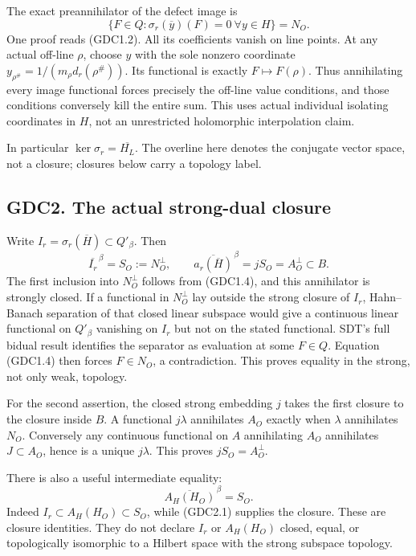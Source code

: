 The exact preannihilator of the defect image is \[
\boxed{\{F\in Q:\sigma_r(\overline y)(F)=0\ \forall y\in H\}=N_O.}
\tag{GDC1.4}
\] One proof reads (GDC1.2). All its coefficients vanish on line points.
At any actual off-line \(\rho\), choose \(y\) with the sole nonzero
coordinate \(y_{\rho^\#}=1/(m_\rho d_r(\rho^\#))\). Its functional is
exactly \(F\mapsto F(\rho)\). Thus annihilating every image functional
forces precisely the off-line value conditions, and those conditions
conversely kill the entire sum. This uses actual individual isolating
coordinates in \(H\), not an unrestricted holomorphic interpolation
claim.

In particular \(\ker\sigma_r=\overline{H_L}\). The overline here denotes
the conjugate vector space, not a closure; closures below carry a
topology label.

\subsection{GDC2. The actual strong-dual
closure}\label{gdc2.-the-actual-strong-dual-closure}

Write \(I_r=\sigma_r(\overline H)\subset Q'_\beta\). Then \[
\boxed{\overline{I_r}^{\,\beta}=S_O:=N_O^\perp,\qquad
\overline{a_r(\overline H)}^{\,\beta}=jS_O=A_O^\perp\subset B.}
\tag{GDC2.1}
\] The first inclusion into \(N_O^\perp\) follows from (GDC1.4), and
this annihilator is strongly closed. If a functional in \(N_O^\perp\)
lay outside the strong closure of \(I_r\), Hahn--Banach separation of
that closed linear subspace would give a continuous linear functional on
\(Q'_\beta\) vanishing on \(I_r\) but not on the stated functional.
SDT's full bidual result identifies the separator as evaluation at some
\(F\in Q\). Equation (GDC1.4) then forces \(F\in N_O\), a contradiction.
This proves equality in the strong, not only weak, topology.

For the second assertion, the closed strong embedding \(j\) takes the
first closure to the closure inside \(B\). A functional \(j\lambda\)
annihilates \(A_O\) exactly when \(\lambda\) annihilates \(N_O\).
Conversely any continuous functional on \(A\) annihilating \(A_O\)
annihilates \(J\subset A_O\), hence is a unique \(j\lambda\). This
proves \(jS_O=A_O^\perp\).

There is also a useful intermediate equality: \[
\overline{A_H(H_O)}^{\,\beta}=S_O.
\tag{GDC2.2}
\] Indeed \(I_r\subset A_H(H_O)\subset S_O\), while (GDC2.1) supplies
the closure. These are closure identities. They do not declare \(I_r\)
or \(A_H(H_O)\) closed, equal, or topologically isomorphic to a Hilbert
space with the strong subspace topology.

